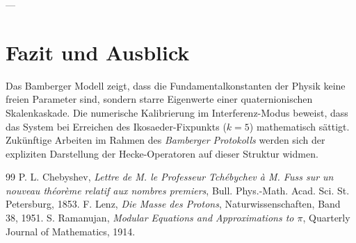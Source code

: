 \documentclass[11pt,a4paper]{article}
\begin{document}
	---
	
	\section{Fazit und Ausblick}
	Das Bamberger Modell zeigt, dass die Fundamentalkonstanten der Physik keine freien Parameter sind, sondern starre Eigenwerte einer quaternionischen Skalenkaskade. Die numerische Kalibrierung im Interferenz-Modus beweist, dass das System bei Erreichen des Ikosaeder-Fixpunkts ($k=5$) mathematisch sättigt. Zukünftige Arbeiten im Rahmen des \emph{Bamberger Protokolls} werden sich der expliziten Darstellung der Hecke-Operatoren auf dieser Struktur widmen.
	
	\newpage
	\begin{thebibliography}{99}
		 P. L. Chebyshev, \textit{Lettre de M. le Professeur Tchébychev à M. Fuss sur un nouveau théorème relatif aux nombres premiers}, Bull. Phys.-Math. Acad. Sci. St. Petersburg, 1853.
		 F. Lenz, \textit{Die Masse des Protons}, Naturwissenschaften, Band 38, 1951.
		 S. Ramanujan, \textit{Modular Equations and Approximations to $\pi$}, Quarterly Journal of Mathematics, 1914.
	\end{thebibliography}
	
\end{document}
